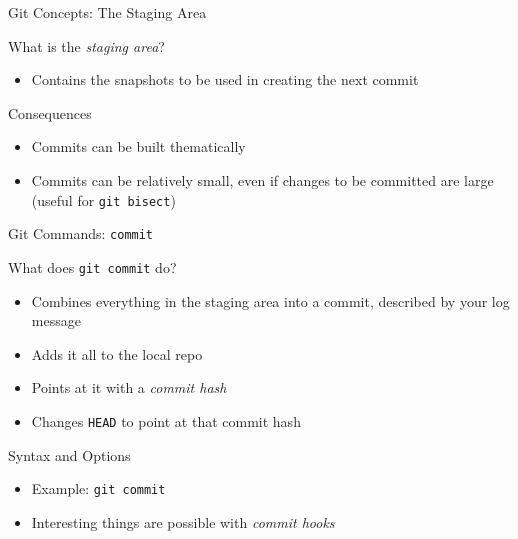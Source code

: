 \documentclass[table,dvipsnames]{beamer}
\begin{document}
\begin{frame}{Git Concepts: The Staging Area}
	\begin{block}{What is the \emph{staging area}?}
		\begin{itemize}
			\item Contains the snapshots to be used in creating the next commit
		\end{itemize}
	\end{block}
	\begin{block}{Consequences}
		\begin{itemize}
			\item Commits can be built thematically
			\item Commits can be relatively small, even if changes to be 
				committed are large (useful for \texttt{git bisect})
		\end{itemize}
	\end{block}
\end{frame}

\begin{frame}{Git Commands: \texttt{commit}}
	\begin{block}{What does \texttt{git commit} do?}
		\begin{itemize}
			\item Combines everything in the staging area into a commit, 
				described by your log message
			\item Adds it all to the local repo
			\item Points at it with a \emph{commit hash}
			\item Changes \texttt{HEAD} to point at that commit hash
		\end{itemize}
	\end{block}
	\begin{block}{Syntax and Options}
		\begin{itemize}
			\item Example: \texttt{git commit}
			\item Interesting things are possible with \emph{commit hooks}
		\end{itemize}
	\end{block}
\end{frame}
\end{document}
